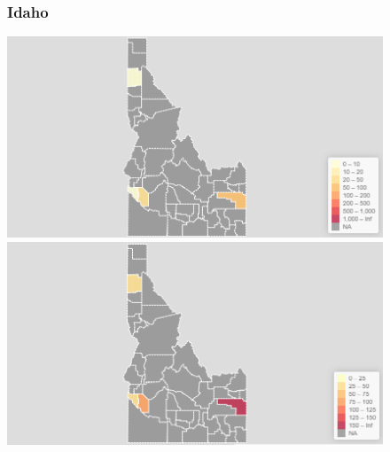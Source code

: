 \documentclass[11pt]{article}
\begin{document}
\begin{landscape}
\thispagestyle{empty}
\begin{figure}[h]
\subsubsection*{Idaho}
\hspace*{-3cm}
\begin{minipage}{.8\textwidth}
    \includegraphics[width=.95\textwidth]{ImageResults/IdahoTotal.PNG}
\end{minipage}%
\begin{minipage}{.8\textwidth}
    \includegraphics[width=.95\textwidth]{ImageResults/Idaho100k.PNG}
\end{minipage}

\end{figure}
\end{landscape}
\end{document}
